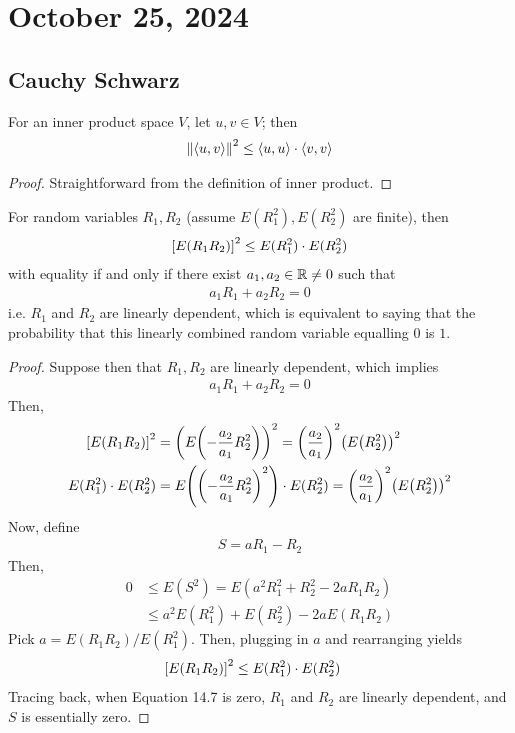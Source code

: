 \section{October 25, 2024}

\subsection{Cauchy Schwarz}
\begin{theorem}
    For an inner product space $V$, let $u,v\in V$; then
    \begin{align}
        \norm{\langle u, v \rangle}^2 \le \langle u, u \rangle \cdot \langle v, v \rangle
    \end{align}
\end{theorem}
\begin{proof}
    Straightforward from the definition of inner product.
\end{proof}

\begin{proposition}
    For random variables $R_1,R_2$ (assume $E(R_1^2),E(R_2^2)$ are finite), then
    \begin{align}
        \qty[ E(R_1R_2) ]^2 \le E(R_1^2) \cdot E(R_2^2)
    \end{align}
    with equality if and only if there exist $a_1,a_2 \in \mathbb{R} \ne 0$ such that
    \begin{align}
        a_1R_1 + a_2R_2 = 0
    \end{align}
    i.e. $R_1$ and $R_2$ are linearly dependent, which is equivalent to saying that the probability that this linearly combined random variable equalling $0$ is $1$.
\end{proposition}
\begin{proof}
    Suppose then that $R_1,R_2$ are linearly dependent, which implies
    \begin{align}
        a_1R_1 + a_2R_2 = 0
    \end{align}
    Then,
    \begin{align}
        \qty[E(R_1R_2)]^2 &= \qty(E\qty(-\frac{a_2}{a_1}R_2^2))^2 = \qty(\frac{a_2}{a_1})^2 \qty(E\qty(R_2^2))^2\\
        E(R_1^2) \cdot E(R_2^2) &= E\qty(\qty(-\frac{a_2}{a_1}R_2^2)^2) \cdot E(R_2^2) = \qty(\frac{a_2}{a_1})^2 \qty(E\qty(R_2^2))^2
    \end{align}
    Now, define
    \begin{align}
        S = aR_1 - R_2
    \end{align}
    Then,
    \begin{align}
        0 &\le E(S^2) = E(a^2R_1^2 + R_2^2 - 2aR_1R_2)\\
        &\le a^2 E(R_1^2) + E(R_2^2) - 2aE(R_1R_2)
    \end{align}
    Pick $a = E(R_1R_2)/E(R_1^2)$. Then, plugging in $a$ and rearranging yields
    \begin{align}
        \qty[E(R_1R_2)]^2 \le E(R_1^2) \cdot E(R_2^2) & \qedhere
    \end{align}
    Tracing back, when Equation 14.7 is zero, $R_1$ and $R_2$ are linearly dependent, and $S$ is essentially zero.
\end{proof}

